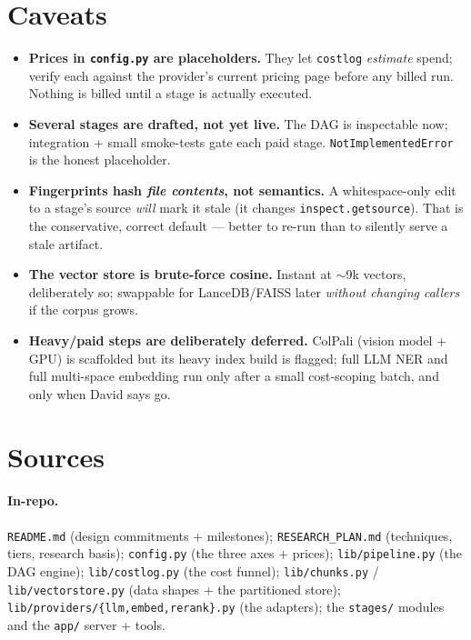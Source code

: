 \documentclass[11pt]{article}
\newcommand{\code}[1]{\texttt{#1}}
\begin{document}
\section{Caveats}

\begin{caveatbox}
\begin{itemize}[leftmargin=1.2em, itemsep=2pt]
  \item \textbf{Prices in \code{config.py} are placeholders.} They let \code{costlog} \emph{estimate}
        spend; verify each against the provider's current pricing page before any billed run. Nothing
        is billed until a stage is actually executed.
  \item \textbf{Several stages are drafted, not yet live.} The DAG is inspectable now; integration +
        small smoke-tests gate each paid stage. \code{NotImplementedError} is the honest placeholder.
  \item \textbf{Fingerprints hash \emph{file contents}, not semantics.} A whitespace-only edit to a
        stage's source \emph{will} mark it stale (it changes \code{inspect.getsource}). That is the
        conservative, correct default --- better to re-run than to silently serve a stale artifact.
  \item \textbf{The vector store is brute-force cosine.} Instant at $\sim$9k vectors, deliberately so;
        swappable for LanceDB/FAISS later \emph{without changing callers} if the corpus grows.
  \item \textbf{Heavy/paid steps are deliberately deferred.} ColPali (vision model + GPU) is
        scaffolded but its heavy index build is flagged; full LLM NER and full multi-space embedding
        run only after a small cost-scoping batch, and only when David says go.
\end{itemize}
\end{caveatbox}

\section{Sources}

\paragraph{In-repo.} \code{README.md} (design commitments + milestones); \code{RESEARCH\_PLAN.md}
(techniques, tiers, research basis); \code{config.py} (the three axes + prices);
\code{lib/pipeline.py} (the DAG engine); \code{lib/costlog.py} (the cost funnel);
\code{lib/chunks.py} / \code{lib/vectorstore.py} (data shapes + the partitioned store);
\code{lib/providers/\{llm,embed,rerank\}.py} (the adapters); the \code{stages/} modules and the
\code{app/} server + tools.
\end{document}
